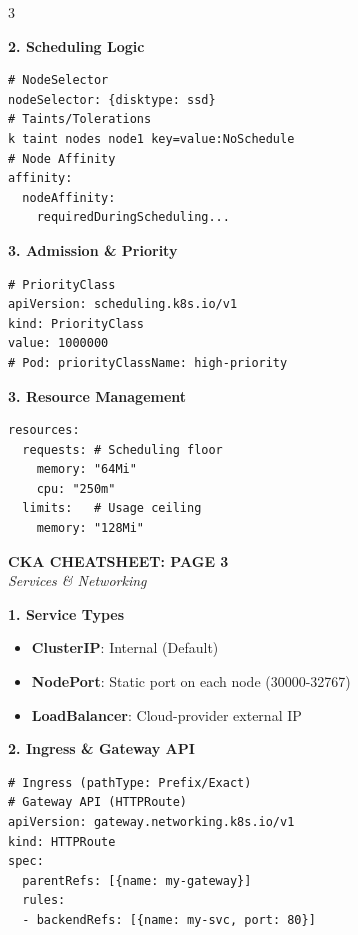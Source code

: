\documentclass[10pt,landscape]{article}
\newcommand{\sectionheader}[1]{%
    \vspace{2pt}\noindent\colorbox{blue!15}{\parbox{\dimexpr\linewidth-2\fboxsep}{%
    \textbf{#1}}}\vspace{2pt}%
}
\begin{document}
\begin{multicols*}{3}
\sectionheader{2. Scheduling Logic}
\begin{lstlisting}
# NodeSelector
nodeSelector: {disktype: ssd}
# Taints/Tolerations
k taint nodes node1 key=value:NoSchedule
# Node Affinity
affinity:
  nodeAffinity:
    requiredDuringScheduling...
\end{lstlisting}

\sectionheader{3. Admission \& Priority}
\begin{lstlisting}
# PriorityClass
apiVersion: scheduling.k8s.io/v1
kind: PriorityClass
value: 1000000
# Pod: priorityClassName: high-priority
\end{lstlisting}

\sectionheader{3. Resource Management}
\begin{lstlisting}
resources:
  requests: # Scheduling floor
    memory: "64Mi"
    cpu: "250m"
  limits:   # Usage ceiling
    memory: "128Mi"
\end{lstlisting}

\columnbreak

\begin{center}\textbf{\Large CKA CHEATSHEET: PAGE 3}\\\textit{Services \& Networking}\end{center}

\sectionheader{1. Service Types}
\begin{itemize}
    \item \textbf{ClusterIP}: Internal (Default)
    \item \textbf{NodePort}: Static port on each node (30000-32767)
    \item \textbf{LoadBalancer}: Cloud-provider external IP
\end{itemize}

\sectionheader{2. Ingress \& Gateway API}
\begin{center}
\end{center}
\begin{lstlisting}
# Ingress (pathType: Prefix/Exact)
# Gateway API (HTTPRoute)
apiVersion: gateway.networking.k8s.io/v1
kind: HTTPRoute
spec:
  parentRefs: [{name: my-gateway}]
  rules:
  - backendRefs: [{name: my-svc, port: 80}]
\end{lstlisting}


\end{multicols*}
\end{document}
